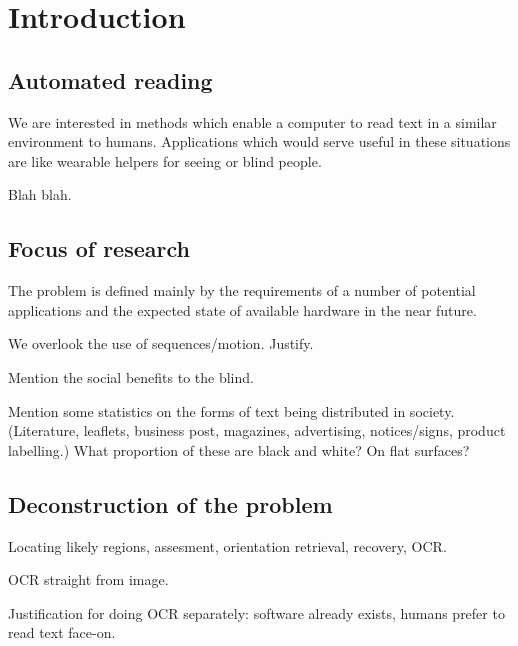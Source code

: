 



\chapter{Introduction}




\section{Automated reading} %

We are interested in methods which enable a computer to read text in a similar environment to humans.  Applications which would serve useful in these situations are like wearable helpers for seeing or blind people.

Blah blah.



\section{Focus of research} %

The problem is defined mainly by the requirements of a number of potential applications and the expected state of available hardware in the near future.

We overlook the use of sequences/motion.  Justify.

Mention the social benefits to the blind.

Mention some statistics on the forms of text being distributed in society.
  (Literature, leaflets, business post, magazines, advertising, notices/signs, product labelling.)
	What proportion of these are black and white?  On flat surfaces?



\section{Deconstruction of the problem} %

Locating likely regions, assesment, orientation retrieval, recovery, OCR.

OCR straight from image.

Justification for doing OCR separately: software already exists, humans prefer to read text face-on.

